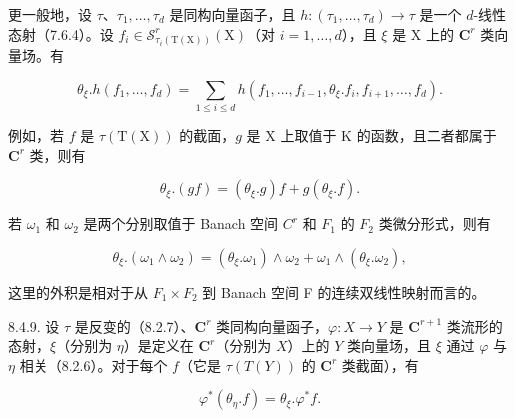 更一般地，设 \(\tau\)、\(\tau_{1},\ldots,\tau_{d}\) 是同构向量函子，且 \(h\colon(\tau_{1},\ldots,\tau_{d})\to\tau\) 是一个 \(d\)-线性态射（7.6.4）。设 \(f_{i}\in\mathcal{S}_{\tau_{i}(\mathrm{T}(\mathrm{X}))}^{r}(\mathrm{X})\)（对 \(i=1,\ldots,d\)），且 \(\xi\) 是 X 上的 \(\mathbf{C}^{r}\) 类向量场。有

\[
\theta_ {\xi}. h (f _ {1}, \dots , f _ {d}) = \sum_ {1 \leqslant i \leqslant d} h (f _ {1}, \dots , f _ {i - 1}, \theta_ {\xi}. f _ {i}, f _ {i + 1}, \dots , f _ {d}).\tag{6}
\]

例如，若 \(f\) 是 \(\tau(\mathrm{T}(\mathrm{X}))\) 的截面，\(g\) 是 \(\mathrm{X}\) 上取值于 \(\mathrm{K}\) 的函数，且二者都属于 \(\mathbf{C}^r\) 类，则有

\[
\theta_ {\xi}. (g f) = (\theta_ {\xi}. g) f + g (\theta_ {\xi}. f).\tag{7}
\]

若 \(\omega_{1}\) 和 \(\omega_{2}\) 是两个分别取值于 Banach 空间 \(C^{r}\) 和 \(F_{1}\) 的 \(F_{2}\) 类微分形式，则有

\[
\theta_ {\xi}. (\omega_ {1} \wedge \omega_ {2}) = (\theta_ {\xi}. \omega_ {1}) \wedge \omega_ {2} + \omega_ {1} \wedge (\theta_ {\xi}. \omega_ {2}),\tag{8}
\]

这里的外积是相对于从 \(F_{1} \times F_{2}\) 到 Banach 空间 F 的连续双线性映射而言的。

8.4.9. 设 \(\tau\) 是反变的（8.2.7）、\(\mathbf{C}^r\) 类同构向量函子，\(\varphi: X \to Y\) 是 \(\mathbf{C}^{r+1}\) 类流形的态射，\(\xi\)（分别为 \(\eta\)）是定义在 \(\mathbf{C}^r\)（分别为 \(X\)）上的 \(Y\) 类向量场，且 \(\xi\) 通过 \(\varphi\) 与 \(\eta\) 相关（8.2.6）。对于每个 \(f\)（它是 \(\tau(T(Y))\) 的 \(\mathbf{C}^r\) 类截面），有

\[
\varphi^ {*} (\theta_ {\eta}. f) = \theta_ {\xi}. \varphi^ {*} f.
\]

